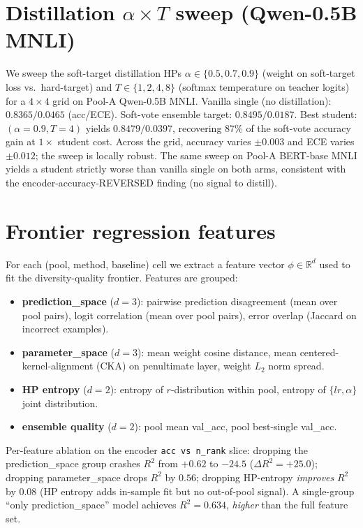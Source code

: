 \documentclass[11pt]{article}
\begin{document}
\section{Distillation $\alpha\times T$ sweep (Qwen-0.5B MNLI)}\label{app:distill}
We sweep the soft-target distillation HPs $\alpha\in\{0.5,0.7,0.9\}$ (weight on soft-target loss vs.\ hard-target) and $T\in\{1,2,4,8\}$ (softmax temperature on teacher logits) for a $4\times4$ grid on Pool-A Qwen-0.5B MNLI. Vanilla single (no distillation): $0.8365 / 0.0465$ (acc/ECE). Soft-vote ensemble target: $0.8495 / 0.0187$. Best student: $(\alpha{=}0.9, T{=}4)$ yields $0.8479 / 0.0397$, recovering $87\%$ of the soft-vote accuracy gain at $1\times$ student cost. Across the grid, accuracy varies $\pm0.003$ and ECE varies $\pm0.012$; the sweep is locally robust. The same sweep on Pool-A BERT-base MNLI yields a student strictly worse than vanilla single on both arms, consistent with the encoder-accuracy-REVERSED finding (no signal to distill).

\section{Frontier regression features}\label{app:features}
For each (pool, method, baseline) cell we extract a feature vector $\phi\in\mathbb{R}^{d}$ used to fit the diversity-quality frontier. Features are grouped:
\begin{itemize}[leftmargin=*]
\item \textbf{prediction\_space} ($d{=}3$): pairwise prediction disagreement (mean over pool pairs), logit correlation (mean over pool pairs), error overlap (Jaccard on incorrect examples).
\item \textbf{parameter\_space} ($d{=}3$): mean weight cosine distance, mean centered-kernel-alignment (CKA) on penultimate layer, weight $L_2$ norm spread.
\item \textbf{HP entropy} ($d{=}2$): entropy of $r$-distribution within pool, entropy of $\{lr, \alpha\}$ joint distribution.
\item \textbf{ensemble quality} ($d{=}2$): pool mean val\_acc, pool best-single val\_acc.
\end{itemize}
Per-feature ablation on the encoder \texttt{acc vs n\_rank} slice: dropping the prediction\_space group crashes $R^2$ from $+0.62$ to $-24.5$ ($\Delta R^2 {=}{+}25.0$); dropping parameter\_space drops $R^2$ by $0.56$; dropping HP-entropy \emph{improves} $R^2$ by $0.08$ (HP entropy adds in-sample fit but no out-of-pool signal). A single-group ``only prediction\_space'' model achieves $R^2{=}0.634$, \emph{higher} than the full feature set.
\end{document}

